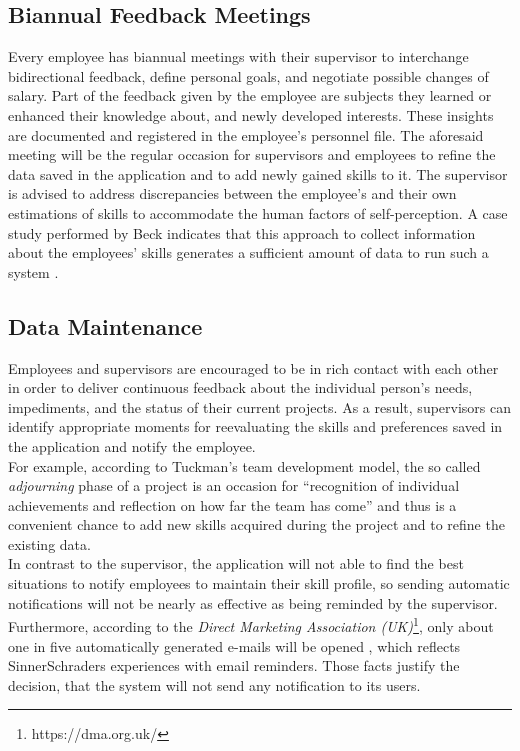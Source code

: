\subsection{Biannual Feedback Meetings}
Every employee has biannual meetings with their supervisor to interchange
bidirectional feedback, define personal goals, and negotiate possible changes of salary.
Part of the feedback given by the employee are subjects they learned or enhanced their knowledge about, and newly developed interests. These insights are documented and registered in the employee's personnel file.
The aforesaid meeting will be the regular occasion for supervisors and employees to refine the data saved in the application and to add
newly gained skills to it. The supervisor is advised to address discrepancies between the employee's and their own estimations of skills to accommodate the human factors of self-perception. A case study performed by Beck indicates that this approach to
collect information about the employees' skills generates a sufficient amount of data to run such a system \cite{beck}.

\subsection{Data Maintenance}
Employees and supervisors are encouraged to be in rich contact with each other in order to deliver continuous feedback
about the individual person's needs, impediments, and the status of their current projects.
As a result, supervisors can identify appropriate moments for reevaluating the skills and preferences saved in the application and notify the employee.\\
For example, according to Tuckman's team development model, the so called \textit{adjourning} phase of a project is an occasion for ``recognition of individual achievements and reflection on how far the team has come'' \cite[P. 3]{Wilson} and thus is a convenient chance to add new skills acquired during the project and to refine the existing data.\\
In contrast to the supervisor, the application will not able to find the best situations to notify employees to maintain their skill profile, so sending automatic notifications will not be nearly as effective as being reminded by the supervisor. Furthermore, according to the \textit{Direct Marketing Association (UK)}\footnote{https://dma.org.uk/}, only
about one in five automatically generated e-mails will be opened \cite{mailrep}, which reflects SinnerSchraders
experiences with email reminders. Those facts justify the decision, that the system will not send any notification to its users.

